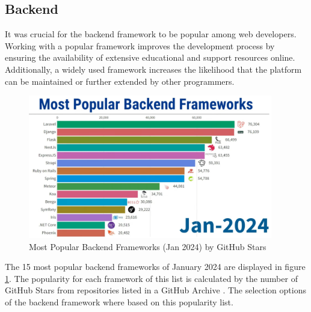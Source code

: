 \subsection{Backend}
\label{subsec:methodology:frameworks:backend}
It was crucial for the backend framework to be popular among web developers. Working with a popular framework improves the development process by ensuring the availability of extensive educational and support resources online. Additionally, a widely used framework increases the likelihood that the platform can be maintained or further extended by other programmers.
\begin{figure}[htbp]
 \centering
 \includegraphics[width=0.95\textwidth]{gfx/figures/Popular_BE.png}
 \caption{Most Popular Backend Frameworks (Jan 2024) by GitHub Stars \cite{backend:popularity}}
 \label{fig:methodology:popularBE}
\end{figure}
The 15 most popular backend frameworks of January 2024 are displayed in figure \ref{fig:methodology:popularBE}. The popularity for each framework of this list is calculated by the number of GitHub Stars from repositories listed in a GitHub Archive \cite{backend:popularity}. The selection options of the backend framework where based on this popularity list. 

